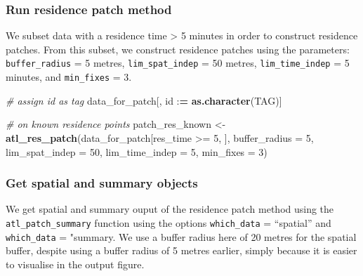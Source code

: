 \documentclass[
]{scrartcl}
\newenvironment{Shaded}{}{}
\newcommand{\CommentTok}[1]{\textcolor[rgb]{0.38,0.63,0.69}{\textit{#1}}}
\newcommand{\DataTypeTok}[1]{\textcolor[rgb]{0.56,0.13,0.00}{#1}}
\newcommand{\DecValTok}[1]{\textcolor[rgb]{0.25,0.63,0.44}{#1}}
\newcommand{\ErrorTok}[1]{\textcolor[rgb]{1.00,0.00,0.00}{\textbf{#1}}}
\newcommand{\KeywordTok}[1]{\textcolor[rgb]{0.00,0.44,0.13}{\textbf{#1}}}
\newcommand{\NormalTok}[1]{#1}
\newcommand{\OperatorTok}[1]{\textcolor[rgb]{0.40,0.40,0.40}{#1}}
\newcommand{\StringTok}[1]{\textcolor[rgb]{0.25,0.44,0.63}{#1}}
\begin{document}
\hypertarget{run-residence-patch-method}{%
\subsubsection{Run residence patch method}\label{run-residence-patch-method}}

We subset data with a residence time \textgreater{} 5 minutes in order to construct residence patches.
From this subset, we construct residence patches using the parameters: \texttt{buffer\_radius} = 5 metres, \texttt{lim\_spat\_indep} = 50 metres, \texttt{lim\_time\_indep} = 5 minutes, and \texttt{min\_fixes} = 3.

\begin{Shaded}
\begin{Highlighting}[]
\CommentTok{\# assign id as tag}
\NormalTok{data\_for\_patch[, id }\OperatorTok{:}\ErrorTok{=}\StringTok{ }\KeywordTok{as.character}\NormalTok{(TAG)]}

\CommentTok{\# on known residence points}
\NormalTok{patch\_res\_known <{-}}\StringTok{ }\KeywordTok{atl\_res\_patch}\NormalTok{(data\_for\_patch[res\_time }\OperatorTok{>=}\StringTok{ }\DecValTok{5}\NormalTok{, ], }
                                \DataTypeTok{buffer\_radius =} \DecValTok{5}\NormalTok{,}
                                \DataTypeTok{lim\_spat\_indep =} \DecValTok{50}\NormalTok{,}
                                \DataTypeTok{lim\_time\_indep =} \DecValTok{5}\NormalTok{,}
                                \DataTypeTok{min\_fixes =} \DecValTok{3}\NormalTok{)}
\end{Highlighting}
\end{Shaded}

\hypertarget{get-spatial-and-summary-objects}{%
\subsubsection{Get spatial and summary objects}\label{get-spatial-and-summary-objects}}

We get spatial and summary ouput of the residence patch method using the \texttt{atl\_patch\_summary} function using the options \texttt{which\_data} = ``spatial'' and \texttt{which\_data} = "summary.
We use a buffer radius here of 20 metres for the spatial buffer, despite using a buffer radius of 5 metres earlier, simply because it is easier to visualise in the output figure.
\end{document}
